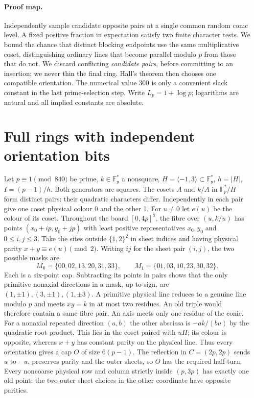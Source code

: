 \documentclass[11pt]{article}
\newcommand{\F}{\mathbb F_p}\newcommand{\G}{\mathcal G}\newcommand{\D}{\mathcal D}\newcommand{\R}{\mathcal R}\newcommand{\Z}{\mathbb Z}\newcommand{\htf}{F_{\mathrm{ht}}}\newcommand{\norm}[1]{\lVert#1\rVert_\infty}\newcommand{\Prob}{\mathbb P}\newcommand{\ch}{\chi}\newcommand{\TT}{\mathcal T}
\begin{document}
\paragraph{Proof map.} Independently sample candidate opposite pairs at a single common random conic level. A fixed positive fraction in expectation satisfy two finite character tests. We bound the chance that distinct blocking endpoints use the same multiplicative coset, distinguishing ordinary lines that become parallel modulo $p$ from those that do not. We discard conflicting \emph{candidate pairs}, before committing to an insertion; we never thin the final ring. Hall's theorem then chooses one compatible orientation. The numerical value 300 is only a convenient slack constant in the last prime-selection step. Write $L_p=1+\log p$; logarithms are natural and all implied constants are absolute.

\section{Full rings with independent orientation bits}
Let $p\equiv1\pmod{840}$ be prime, $k\in\F^*$ a nonsquare, $H=\langle -1,3\rangle\subset\F^*$, $h=|H|$, $I=(p-1)/h$. Both generators are squares. The cosets $A$ and $k/A$ in $\F^*/H$ form distinct pairs: their quadratic characters differ. Independently in each pair give one coset physical colour 0 and the other 1. For $u\ne0$ let $e(u)$ be the colour of its coset. Throughout the board $[0,4p]^2$, the fibre over $(u,k/u)$ has points $(x_0+ip,y_0+jp)$ with least positive representatives $x_0,y_0$ and $0\le i,j\le3$. Take the sites outside $\{1,2\}^2$ in sheet indices and having physical parity $x+y\equiv e(u)\pmod 2$. Writing $ij$ for the sheet pair $(i,j)$, the two possible masks are
\[
 M_0=\{00,02,13,20,31,33\},\qquad M_1=\{01,03,10,23,30,32\}.
\]
Each is a six-point cap. Subtracting its points in pairs shows that the only primitive nonaxial directions in a mask, up to sign, are $(1,\pm1),(3,\pm1),(1,\pm3)$. A primitive physical line reduces to a genuine line modulo $p$ and meets $xy=k$ in at most two residues. An old triple would therefore contain a same-fibre pair. An axis meets only one residue of the conic. For a nonaxial repeated direction $(a,b)$ the other abscissa is $-ak/(bu)$ by the quadratic root product. This lies in the coset paired with $uH$; its colour is opposite, whereas $x+y$ has constant parity on the physical line. Thus every orientation gives a cap $O$ of size $6(p-1)$. The reflection in $C=(2p,2p)$ sends $u$ to $-u$, preserves parity and the outer sheets, so $O$ has the required half-turn. Every noncoarse physical row and column strictly inside $(p,3p)$ has exactly one old point: the two outer sheet choices in the other coordinate have opposite parities.
\end{document}
